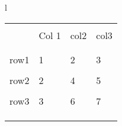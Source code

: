 \begin{tabular}{l}

\toprule
\begin{tabular}{llll} \\
\midrule
 \\
\toprule \\
 & Col 1 & col2 & col3 \\ \\
\midrule \\
row1 & 1 & 2 & 3 \\ \\
row2 & 2 & 4 & 5 \\ \\
row3 & 3 & 6 & 7 \\ \\
 \\
\bottomrule \\
\end{tabular} \\

\bottomrule
\end{tabular}


